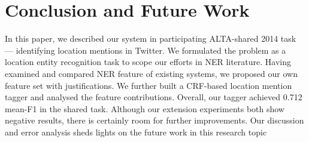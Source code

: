\documentclass[11pt]{article}
\begin{document}
\section{Conclusion and Future Work}
\label{sec:conclusion}
In this paper, we described our system in participating ALTA-shared 2014 task --- identifying location mentions in Twitter.
We formulated the problem as a location entity recognition task to scope our efforts in NER literature.
Having examined and compared NER feature of existing systems, we proposed our own feature set with justifications.
We further built a CRF-based location mention tagger and analysed the feature contributions.
Overall, our tagger achieved 0.712 mean-F1 in the shared task.
Although our extension experiments both show negative results, there is certainly room for further improvements.
Our discussion and error analysis sheds lights on the future work in this research topic



\end{document}
